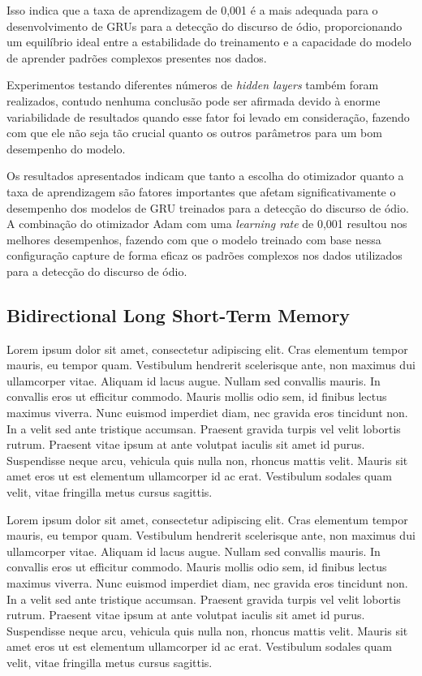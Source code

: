 \documentclass[conference]{IEEEtran}
\begin{document}
Isso indica que a taxa de aprendizagem de 0,001 é a mais adequada para o desenvolvimento de GRUs para a detecção do discurso de ódio, proporcionando um equilíbrio ideal entre a estabilidade do treinamento e a capacidade do modelo de aprender padrões complexos presentes nos dados.

Experimentos testando diferentes números de \textit{hidden layers} também foram realizados, contudo nenhuma conclusão pode ser afirmada devido à enorme variabilidade de resultados quando esse fator foi levado em consideração, fazendo com que ele não seja tão crucial quanto os outros parâmetros para um bom desempenho do modelo.

Os resultados apresentados indicam que tanto a escolha do otimizador quanto a taxa de aprendizagem são fatores importantes que afetam significativamente o desempenho dos modelos de GRU treinados para a detecção do discurso de ódio. A combinação do otimizador Adam com uma \textit{learning rate} de 0,001 resultou nos melhores desempenhos, fazendo com que o modelo treinado com base nessa configuração capture de forma eficaz os padrões complexos nos dados utilizados para a detecção do discurso de ódio.

\subsection{Bidirectional Long Short-Term Memory}

Lorem ipsum dolor sit amet, consectetur adipiscing elit. Cras elementum tempor mauris, eu tempor quam. Vestibulum hendrerit scelerisque ante, non maximus dui ullamcorper vitae. Aliquam id lacus augue. Nullam sed convallis mauris. In convallis eros ut efficitur commodo. Mauris mollis odio sem, id finibus lectus maximus viverra. Nunc euismod imperdiet diam, nec gravida eros tincidunt non. In a velit sed ante tristique accumsan. Praesent gravida turpis vel velit lobortis rutrum. Praesent vitae ipsum at ante volutpat iaculis sit amet id purus. Suspendisse neque arcu, vehicula quis nulla non, rhoncus mattis velit. Mauris sit amet eros ut est elementum ullamcorper id ac erat. Vestibulum sodales quam velit, vitae fringilla metus cursus sagittis.

Lorem ipsum dolor sit amet, consectetur adipiscing elit. Cras elementum tempor mauris, eu tempor quam. Vestibulum hendrerit scelerisque ante, non maximus dui ullamcorper vitae. Aliquam id lacus augue. Nullam sed convallis mauris. In convallis eros ut efficitur commodo. Mauris mollis odio sem, id finibus lectus maximus viverra. Nunc euismod imperdiet diam, nec gravida eros tincidunt non. In a velit sed ante tristique accumsan. Praesent gravida turpis vel velit lobortis rutrum. Praesent vitae ipsum at ante volutpat iaculis sit amet id purus. Suspendisse neque arcu, vehicula quis nulla non, rhoncus mattis velit. Mauris sit amet eros ut est elementum ullamcorper id ac erat. Vestibulum sodales quam velit, vitae fringilla metus cursus sagittis.
\end{document}
